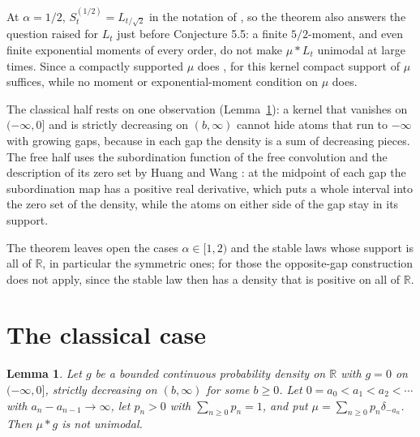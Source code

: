 \documentclass[11pt]{amsart}
\newtheorem{lemma}[theorem]{Lemma}
\theoremstyle{definition}
\theoremstyle{remark}
\numberwithin{equation}{section}
\newcommand{\R}{\mathbb R}
\begin{document}
At $\alpha=1/2$, $S^{(1/2)}_t=L_{t/\sqrt2}$ in the notation of \cite{HU}, so the theorem also answers the question raised for $L_t$ just before Conjecture 5.5: a finite $5/2$-moment, and even finite exponential moments of every order, do not make $\mu*L_t$ unimodal at large times. Since a compactly supported $\mu$ does \cite[Theorem 5.3]{HU}, for this kernel compact support of $\mu$ suffices, while no moment or exponential-moment condition on $\mu$ does.

The classical half rests on one observation (Lemma~\ref{lem:classical}): a kernel that vanishes on $(-\infty,0]$ and is strictly decreasing on $(b,\infty)$ cannot hide atoms that run to $-\infty$ with growing gaps, because in each gap the density is a sum of decreasing pieces. The free half uses the subordination function of the free convolution and the description of its zero set by Huang and Wang \cite{HW}: at the midpoint of each gap the subordination map has a positive real derivative, which puts a whole interval into the zero set of the density, while the atoms on either side of the gap stay in its support.

The theorem leaves open the cases $\alpha\in[1,2)$ and the stable laws whose support is all of $\R$, in particular the symmetric ones; for those the opposite-gap construction does not apply, since the stable law then has a density that is positive on all of $\R$.

\section{The classical case}\label{sec:classical}

\begin{lemma}\label{lem:classical}
Let $g$ be a bounded continuous probability density on $\R$ with $g=0$ on $(-\infty,0]$, strictly decreasing on $(b,\infty)$ for some $b\ge0$. Let $0=a_0<a_1<a_2<\cdots$ with $a_n-a_{n-1}\to\infty$, let $p_n>0$ with $\sum_{n\ge0}p_n=1$, and put $\mu=\sum_{n\ge0}p_n\delta_{-a_n}$. Then $\mu*g$ is not unimodal.
\end{lemma}
\end{document}
